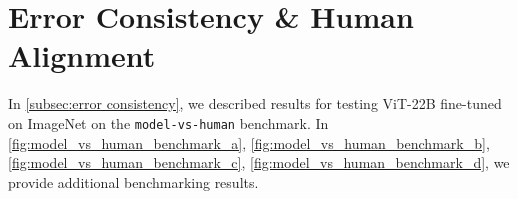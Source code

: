 \documentclass{article}
\begin{document}
\begin{table}[t]
    \caption{Evaluation on some representative metrics from the Plex reliability benchmark~\citep{tran2022plex}.}
\centering
  \setlength{\tabcolsep}{4pt}
    \label{tab:full_plex}
\end{table}

\section{Error Consistency \& Human Alignment}
In \cref{subsec:error consistency}, we described results for testing ViT-22B fine-tuned on ImageNet on the \texttt{model-vs-human} benchmark. In \cref{fig:model_vs_human_benchmark_a}, \cref{fig:model_vs_human_benchmark_b}, \cref{fig:model_vs_human_benchmark_c}, \cref{fig:model_vs_human_benchmark_d}, we provide additional benchmarking results.
\end{document}
